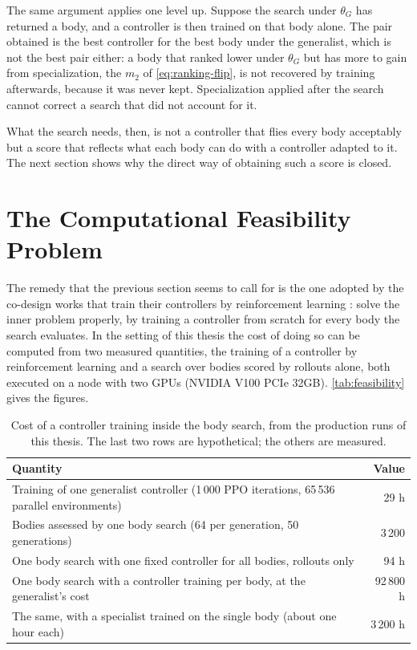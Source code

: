 The same argument applies one level up. Suppose the search under $\theta_G$ has returned a body, and a controller is then trained on that body alone. The pair obtained is the best controller for the best body under the generalist, which is not the best pair either: a body that ranked lower under $\theta_G$ but has more to gain from specialization, the $m_2$ of \eqref{eq:ranking-flip}, is not recovered by training afterwards, because it was never kept. Specialization applied after the search cannot correct a search that did not account for it.

What the search needs, then, is not a controller that flies every body acceptably but a score that reflects what each body can do with a controller adapted to it. The next section shows why the direct way of obtaining such a score is closed.

\section{The Computational Feasibility Problem}
\label{sec:problem-feasibility}

The remedy that the previous section seems to call for is the one adopted by the co-design works that train their controllers by reinforcement learning \cite{gupta2021embodied, muff2026hexacopters}: solve the inner problem properly, by training a controller from scratch for every body the search evaluates. In the setting of this thesis the cost of doing so can be computed from two measured quantities, the training of a controller by reinforcement learning and a search over bodies scored by rollouts alone, both executed on a node with two GPUs (NVIDIA V100 PCIe 32GB). \autoref{tab:feasibility} gives the figures.

\begin{table}[htbp]
\centering
\begin{tabularx}{\textwidth}{>{\raggedright\arraybackslash}X r}
\hline
Quantity & Value \\
\hline
Training of one generalist controller (1\,000 PPO iterations, 65\,536 parallel environments) & 29 h \\
\hline
Bodies assessed by one body search (64 per generation, 50 generations) & 3\,200 \\
One body search with one fixed controller for all bodies, rollouts only & 94 h \\
One body search with a controller training per body, at the generalist's cost & 92\,800 h \\
The same, with a specialist trained on the single body (about one hour each) & 3\,200 h \\
\hline
\end{tabularx}
\caption[Cost of a controller training inside the body search]{Cost of a controller training inside the body search, from the production runs of this thesis. The last two rows are hypothetical; the others are measured.}
\label{tab:feasibility}
\end{table}


